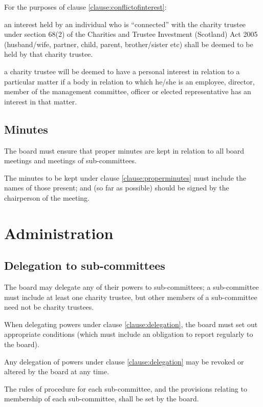 \documentclass{article}
\newcommand{\charityact}{Charities and Trustee Investment (Scotland) Act 2005}
\begin{document}
\clause For the purposes of clause \ref{clause:conflictofinterest}:

\subclause an interest held by an individual who is ``connected'' with
the charity trustee under section 68(2) of the \charityact
(husband/wife, partner, child, parent, brother/sister etc) shall be
deemed to be held by that charity trustee.

\subclause a charity trustee will be deemed to have a personal
interest in relation to a particular matter if a body in relation to
which he/she is an employee, director, member of the management
committee, officer or elected representative has an interest in that
matter.

\subsection{Minutes}

\clause\label{clause:properminutes}The board must ensure that proper
minutes are kept in relation to all board meetings and meetings of
sub-committees.

\clause The minutes to be kept under clause \ref{clause:properminutes}
must include the names of those present; and (so far as possible)
should be signed by the chairperson of the meeting.

\section{Administration}

\subsection{Delegation to sub-committees}

\clause\label{clause:delegation}The board may delegate any of their
powers to sub-committees; a sub-committee must include at least one
charity trustee, but other members of a sub-committee need not be
charity trustees.

\clause When delegating powers under clause \ref{clause:delegation},
the board must set out appropriate conditions (which must include an
obligation to report regularly to the board).

\clause Any delegation of powers under clause \ref{clause:delegation}
may be revoked or altered by the board at any time.

\clause The rules of procedure for each sub-committee, and the
provisions relating to membership of each sub-committee, shall be set
by the board.
\end{document}
